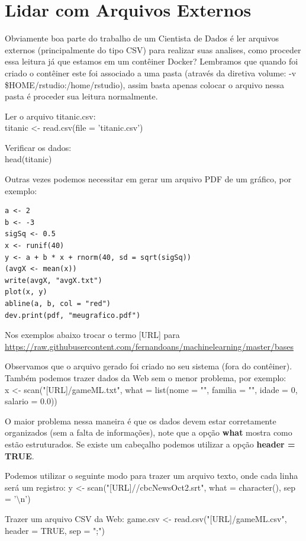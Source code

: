 \documentclass[a4paper,11pt]{article}
\begin{document}
\section{Lidar com Arquivos Externos}
Obviamente boa parte do trabalho de um Cientista de Dados é ler arquivos externos (principalmente do tipo CSV) para realizar suas analises, como proceder essa leitura já que estamos em um contêiner Docker? Lembramos que quando foi criado o contêiner este foi associado a uma pasta (através da diretiva volume: {\ttfamily -v \$HOME/rstudio:/home/rstudio}), assim basta apenas colocar o arquivo nessa pasta é proceder sua leitura normalmente.

Ler o arquivo titanic.csv: \\
{\ttfamily titanic <- read.csv(file = 'titanic.csv')}

Verificar os dados: \\
{\ttfamily head(titanic)}

Outras vezes podemos necessitar em gerar um arquivo PDF de um gráfico, por exemplo:
\begin{lstlisting}
a <- 2
b <- -3
sigSq <- 0.5
x <- runif(40)
y <- a + b * x + rnorm(40, sd = sqrt(sigSq))
(avgX <- mean(x))
write(avgX, "avgX.txt")
plot(x, y)
abline(a, b, col = "red")
dev.print(pdf, "meugrafico.pdf")
\end{lstlisting}

\begin{theo}[]{}
Nos exemplos abaixo trocar o termo [URL] para \\ \url{https://raw.githubusercontent.com/fernandoans/machinelearning/master/bases}
\end{theo}

Observamos que o arquivo gerado foi criado no seu sistema (fora do contêiner). Também podemos trazer dados da Web sem o menor problema, por exemplo: \\
{\ttfamily x <- scan("[URL]/gameML.txt", what = list(nome = "", familia = "", idade = 0, salario = 0.0))}

O maior problema nessa maneira é que os dados devem estar corretamente organizados (sem a falta de informações), note que a opção \textbf{what} mostra como estão estruturados. Se existe um cabeçalho podemos utilizar a opção \textbf{header = TRUE}.

Podemos utilizar o seguinte modo para trazer um arquivo texto, onde cada linha será um registro:
{\ttfamily y <- scan("[URL]//cbcNewsOct2.srt", what = character(), sep = '$\setminus$n')}

Trazer um arquivo CSV da Web:
{\ttfamily game.csv <- read.csv("[URL]/gameML.csv", header = TRUE, sep = ";")}
\end{document}
